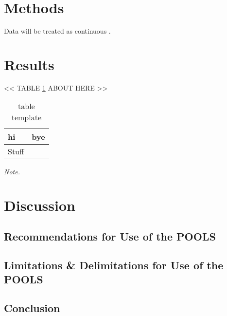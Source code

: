 \documentclass[man, noextraspace, floatsintext, 12pt]{apa7}
\begin{document}
\section{Methods}

Data will be treated as continuous \citep{Rhemtulla2012}.


\section{Results}



<< TABLE \ref{tb:ex} ABOUT HERE >>


\begin{table}[ht]
 \centering
 \begin{threeparttable}
 \caption{table template} 
 \label{tb:ex}
\begin{tabular}{lr}
  \toprule
hi & bye \\ 
  \midrule
  Stuff &\\
   \bottomrule
\end{tabular}
 \vspace*{1mm}
 	\begin{tablenotes}
    {\small
        \textit{Note.} 
    }
 	\end{tablenotes}
 \end{threeparttable}
\end{table}
 



\section{Discussion}



\subsection{Recommendations for Use of the POOLS}



\subsection{Limitations \& Delimitations for Use of the POOLS}



\subsection{Conclusion}
\end{document}
